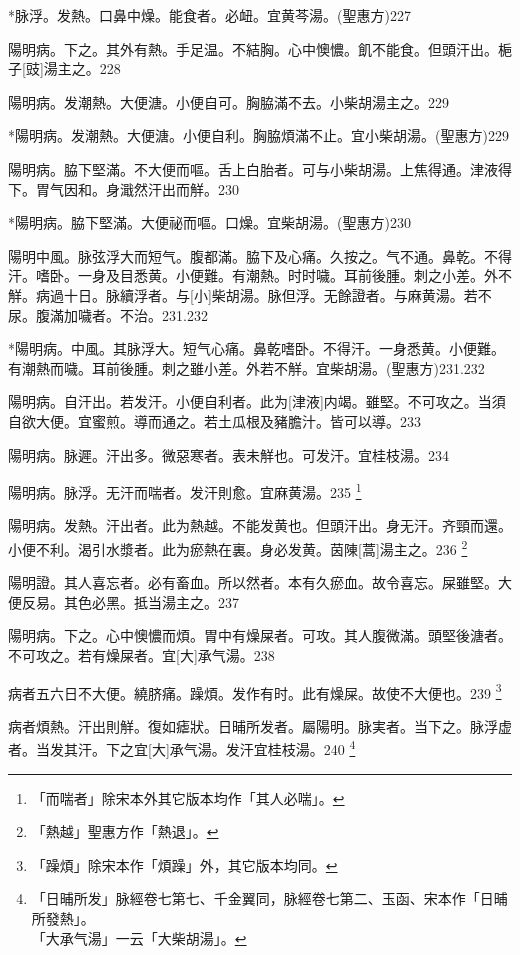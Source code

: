 \documentclass[12pt,oneside,UTF8,b5paper]{ctexbook}她她她她她她她
\begin{document}
*脉浮。发熱。口鼻中燥。能食者。必衄。宜黄芩湯。(聖惠方)227

陽明病。下之。其外有熱。手足温。不結胸。心中懊憹。飢不能食。但頭汗出。梔子[豉]湯主之。228

陽明病。发潮熱。大便溏。小便自可。胸脇滿不去。小柴胡湯主之。229

*陽明病。发潮熱。大便溏。小便自利。胸脇煩滿不止。宜小柴胡湯。(聖惠方)229

陽明病。脇下堅滿。不大便而嘔。舌上白胎者。可与小柴胡湯。上焦得通。津液得下。胃气因和。身濈然汗出而觧。230

*陽明病。脇下堅滿。大便祕而嘔。口燥。宜柴胡湯。(聖惠方)230

陽明中風。脉弦浮大而短气。腹都滿。脇下及心痛。久按之。气不通。鼻乾。不得汗。嗜卧。一身及目悉黄。小便難。有潮熱。时时噦。耳前後腫。刺之小差。外不觧。病過十日。脉續浮者。与[小]柴胡湯。脉但浮。无餘證者。与麻黄湯。若不尿。腹滿加噦者。不治。231.232

*陽明病。中風。其脉浮大。短气心痛。鼻乾嗜卧。不得汗。一身悉黄。小便難。有潮熱而噦。耳前後腫。刺之雖小差。外若不觧。宜柴胡湯。(聖惠方)231.232

陽明病。自汗出。若发汗。小便自利者。此为[津液]内竭。雖堅。不可攻之。当須自欲大便。宜蜜煎。導而通之。若土瓜根及豬膽汁。皆可以導。233

陽明病。脉遲。汗出多。微惡寒者。表未觧也。可发汗。宜桂枝湯。234

陽明病。脉浮。无汗而喘者。发汗則愈。宜麻黄湯。235
	\footnote{「而喘者」除宋本外其它版本均作「其人必喘」。}

陽明病。发熱。汗出者。此为熱越。不能发黄也。但頭汗出。身无汗。齐頸而還。小便不利。渴引水漿者。此为瘀熱在裏。身必发黄。茵陳[蒿]湯主之。236
	\footnote{「熱越」聖惠方作「熱退」。}

陽明證。其人喜忘者。必有畜血。所以然者。本有久瘀血。故令喜忘。屎雖堅。大便反易。其色必黑。抵当湯主之。237

陽明病。下之。心中懊憹而煩。胃中有燥屎者。可攻。其人腹微滿。頭堅後溏者。不可攻之。若有燥屎者。宜[大]承气湯。238

病者五六日不大便。繞脐痛。躁煩。发作有时。此有燥屎。故使不大便也。239
	\footnote{「躁煩」除宋本作「煩躁」外，其它版本均同。}

病者煩熱。汗出則觧。復如瘧狀。日晡所发者。屬陽明。脉実者。当下之。脉浮虚者。当发其汗。下之宜[大]承气湯。发汗宜桂枝湯。240
	\footnote{「日晡所发」脉經卷七第七、千金翼同，脉經卷七第二、玉函、宋本作「日晡所發熱」。\\「大承气湯」一云「大柴胡湯」。}
\end{document}

